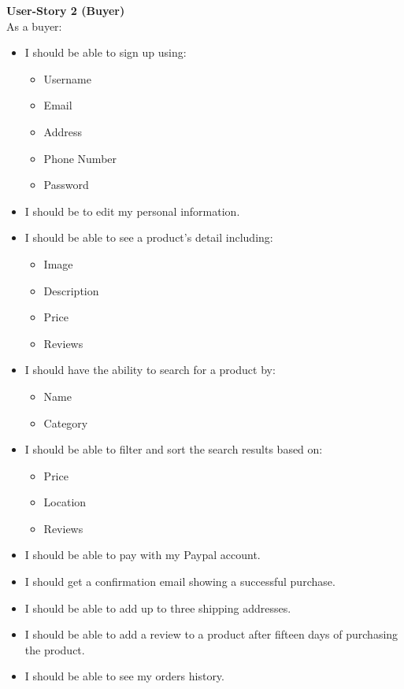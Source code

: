 \documentclass[11pt]{article}
\begin{document}
\textbf{User-Story 2 (Buyer)} \\
As a buyer:
\begin{itemize}
    \item I should be able to sign up using:
        \begin{itemize}
            \item Username
            \item Email
            \item Address
            \item Phone Number
            \item Password
        \end{itemize}
    \item I should be to edit my personal information.
    \item I should be able to see a product's detail including:
        \begin{itemize}
            \item Image
            \item Description
            \item Price
            \item Reviews
        \end{itemize}
    \item I should have the ability to search for a product by:
        \begin{itemize}
            \item Name
            \item Category
        \end{itemize}
    \item I should be able to filter and sort the search results based on:
        \begin{itemize}
            \item Price
            \item Location
            \item Reviews
        \end{itemize}
    \item I should be able to pay with my Paypal account.
    \item I should get a confirmation email showing a successful purchase.
    \item I should be able to add up to three shipping addresses.
    \item I should be able to add a review to a product after fifteen days of purchasing the product.
    \item I should be able to see my orders history.
    
\end{itemize}
\end{document}
